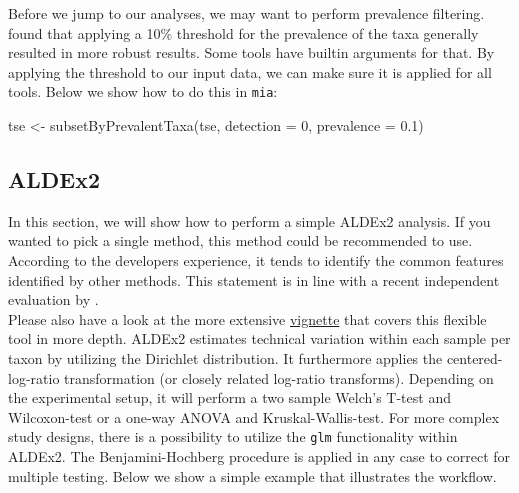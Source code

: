 \documentclass[
]{book}
\newenvironment{Shaded}{\begin{snugshade}}{\end{snugshade}}
\newcommand{\AttributeTok}[1]{\textcolor[rgb]{0.77,0.63,0.00}{#1}}
\newcommand{\DecValTok}[1]{\textcolor[rgb]{0.00,0.00,0.81}{#1}}
\newcommand{\FloatTok}[1]{\textcolor[rgb]{0.00,0.00,0.81}{#1}}
\newcommand{\FunctionTok}[1]{\textcolor[rgb]{0.00,0.00,0.00}{#1}}
\newcommand{\NormalTok}[1]{#1}
\newcommand{\OtherTok}[1]{\textcolor[rgb]{0.56,0.35,0.01}{#1}}
\begin{document}
Before we jump to our analyses, we may want to perform prevalence filtering.
\citet{Nearing2022} found that applying a 10\% threshold
for the prevalence of the taxa generally resulted in more robust results.
Some tools have builtin arguments for that. By applying the threshold to our
input data, we can make sure it is applied for all tools. Below we show how to
do this in \texttt{mia}:

\begin{Shaded}
\begin{Highlighting}[]
\NormalTok{tse }\OtherTok{\textless{}{-}} \FunctionTok{subsetByPrevalentTaxa}\NormalTok{(tse, }\AttributeTok{detection =} \DecValTok{0}\NormalTok{, }\AttributeTok{prevalence =} \FloatTok{0.1}\NormalTok{)}
\end{Highlighting}
\end{Shaded}

\hypertarget{aldex2}{%
\subsection{ALDEx2}\label{aldex2}}

In this section, we will show how to perform a simple ALDEx2 analysis.
If you wanted to pick a single method, this method could be recommended to use.
According to the developers experience, it tends to identify the common
features identified by other methods. This statement is in line with a recent
independent evaluation by \citet{Nearing2022}.\\
Please also have a look at the more extensive
\href{https://bioconductor.org/packages/release/bioc/vignettes/ALDEx2/inst/doc/ALDEx2_vignette.html}{vignette}
that covers this flexible tool in more depth. ALDEx2 estimates technical
variation within each sample per taxon by utilizing the Dirichlet distribution.
It furthermore applies the centered-log-ratio transformation (or closely
related log-ratio transforms). Depending on the experimental setup, it will
perform a two sample Welch's T-test and Wilcoxon-test or a one-way ANOVA and
Kruskal-Wallis-test. For more complex study designs, there is a possibility to
utilize the \texttt{glm} functionality within ALDEx2. The Benjamini-Hochberg procedure
is applied in any case to correct for multiple testing. Below we show a simple
example that illustrates the workflow.
\end{document}
